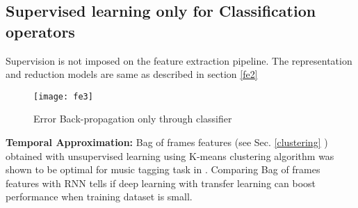 \subsection{Supervised learning only for Classification operators}
\label{fe3}
Supervision is not imposed on the feature extraction pipeline. The representation and reduction models are same as described in section \ref{fe2}
\begin{figure}[h] 
\centering
\texttt{[image: fe3]}
\caption{Error Back-propagation only through classifier }
 \label{fig:fe3}
 \end{figure}
\FloatBarrier 

\noindent \textbf{Temporal Approximation:} Bag of frames features (see Sec. \ref{clustering} ) obtained with unsupervised learning using K-means clustering algorithm was shown to be optimal for music tagging task in \cite{MultiScale}. Comparing Bag of frames features with RNN tells if deep learning with transfer learning can boost performance when training dataset is small. 